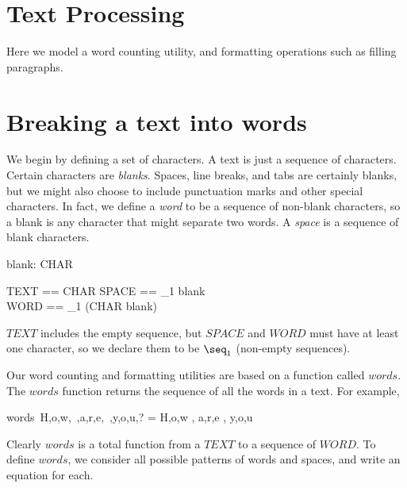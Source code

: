 
\section*{Text Processing}

Here we model a word counting utility, and formatting operations such
as filling paragraphs.

\section{Breaking a text into words}

We begin by defining a set of characters.  A text is just a
sequence of characters.  Certain characters are {\em blanks}.  Spaces, line
breaks, and tabs are certainly blanks, but we might also choose to include
punctuation marks and other special characters.  In fact, we define a 
{\em word} to be a sequence of non-blank characters, 
so a blank is any character
that might separate two words.  A {\em space} is a sequence of blank
characters.  

\begin{zed} [CHAR] \end{zed}
\begin{axdef} blank: \power CHAR \end{axdef}
\begin{zed}
        TEXT == \seq CHAR
\also
	SPACE == \seq_1 blank \\
\also
	WORD == \seq_1 (CHAR \setminus blank)
\end{zed}
$TEXT$ includes the empty sequence, but $SPACE$ and $WORD$ must have
at least one character, so we declare them to be $\seq_1$ (non-empty
sequences).

Our word counting and formatting utilities are based on a function called
$words$.  The $words$ function returns the sequence of all the words in a
text.  For example,

\begin{zed}
words~\langle H,o,w,~,a,r,e,~,y,o,u,? \rangle = \langle \langle H,o,w \rangle , \langle a,r,e \rangle , \langle y,o,u \rangle \rangle
\end{zed}
Clearly $words$ is a total function from a $TEXT$ to a sequence of $WORD$.
To define $words$, we consider all possible patterns of words and spaces, and
write an equation for each. 

